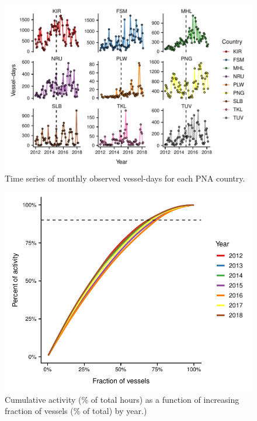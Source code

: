 \documentclass[12pt]{article}
\begin{document}
\begin{figure}
\centering
\includegraphics{img/PS_VDS_PNA_by_month_eez.pdf}
\caption{\label{PS_VDS_PNA_by_month_eez}Time series of monthly observed vessel-days for each PNA country.}
\end{figure}

\begin{figure}
\centering
\includegraphics{img/nvessels_to_90.pdf}
\caption{\label{fig:nvessels_to_90}Cumulative activity (\% of total hours) as a function of increasing fraction of vessels (\% of total) by year.)}
\end{figure}



\end{document}
